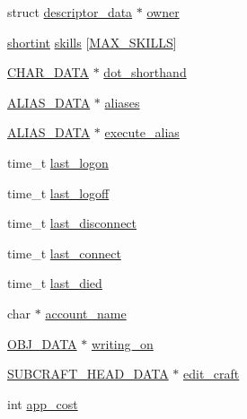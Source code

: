 \begin{DoxyCompactItemize}
\item 
struct \hyperlink{structdescriptor__data}{descriptor\-\_\-data} $\ast$ \hyperlink{structpc__data_aa784fe7f400f8836b6ccfdddca244414}{owner}
\item 
\hyperlink{structs_8h_a083f081df8f705562c500e016f338096}{shortint} \hyperlink{structpc__data_acea1f164f11de5f686983c8923934d88}{skills} \mbox{[}\hyperlink{structs_8h_a4e56530a094cfb02145de1378db9cd6d}{M\-A\-X\-\_\-\-S\-K\-I\-L\-L\-S}\mbox{]}
\item 
\hyperlink{structs_8h_af33ed1e66e8541a08bed257124f50f31}{C\-H\-A\-R\-\_\-\-D\-A\-T\-A} $\ast$ \hyperlink{structpc__data_a284e5ee6f3328b61e9c81edc81af957f}{dot\-\_\-shorthand}
\item 
\hyperlink{structs_8h_a9e91d84870744ab3d5ffd36db5e074e9}{A\-L\-I\-A\-S\-\_\-\-D\-A\-T\-A} $\ast$ \hyperlink{structpc__data_ad5a38f06bacdf18b478fa3471f021284}{aliases}
\item 
\hyperlink{structs_8h_a9e91d84870744ab3d5ffd36db5e074e9}{A\-L\-I\-A\-S\-\_\-\-D\-A\-T\-A} $\ast$ \hyperlink{structpc__data_a74737a27663ee03b63ca6e77a5b205c0}{execute\-\_\-alias}
\item 
time\-\_\-t \hyperlink{structpc__data_a0b5c097765ec483705637fd7c617320b}{last\-\_\-logon}
\item 
time\-\_\-t \hyperlink{structpc__data_a9dba0ae7fe185bfc31e4ba2bf7586be9}{last\-\_\-logoff}
\item 
time\-\_\-t \hyperlink{structpc__data_a2a49a5321a80c9f31ddb943885f5f080}{last\-\_\-disconnect}
\item 
time\-\_\-t \hyperlink{structpc__data_a5c85d570eef22a111a8de987aa3a7d4c}{last\-\_\-connect}
\item 
time\-\_\-t \hyperlink{structpc__data_ac6e78fcf2207dd2489638962bd793d2f}{last\-\_\-died}
\item 
char $\ast$ \hyperlink{structpc__data_a5f4d1fc83ffd2a3f2a43387740c3b560}{account\-\_\-name}
\item 
\hyperlink{structs_8h_aaa59141dfc8c6ecdb6bfcf1537dd52d1}{O\-B\-J\-\_\-\-D\-A\-T\-A} $\ast$ \hyperlink{structpc__data_af52a407aac34be84c0b0bea0960360a0}{writing\-\_\-on}
\item 
\hyperlink{structs_8h_a495309683b6f6354b20a79327e7d77d9}{S\-U\-B\-C\-R\-A\-F\-T\-\_\-\-H\-E\-A\-D\-\_\-\-D\-A\-T\-A} $\ast$ \hyperlink{structpc__data_adc6a3f874388e0c85dea779600fc344e}{edit\-\_\-craft}
\item 
int \hyperlink{structpc__data_a21dd830cee78670dd342d4ba8ad48d0b}{app\-\_\-cost}
\item 

\end{DoxyCompactItemize}
